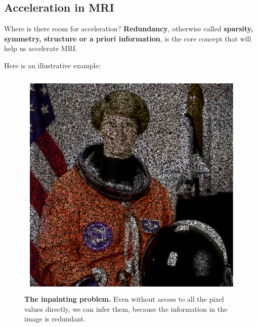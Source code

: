 \documentclass[aspectratio=169,xcolor=dvipsnames]{beamer}
\begin{document}
\subsection{Acceleration in MRI}
\begin{frame}{Where is there room for acceleration?}
    \textbf{Redundancy}, otherwise called \textbf{sparsity, symmetry, structure or a priori information}, is the core concept that will help us accelerate MRI.\\
    
    \begin{overprint}
        \hfill \break
    Here is an illustrative example:
    \begin{figure}
        \centering
        \includegraphics[height=0.4\textheight]{Figures/intro_figures/astronaut_masked.pdf}
        \caption{\label{fig:astronaut-masked}\textbf{The inpainting problem.} Even without access to all the pixel values directly, we can infer them, because the information in the image is redundant.
        }
    \end{figure}
    

\end{overprint}
\end{frame}
\end{document}
